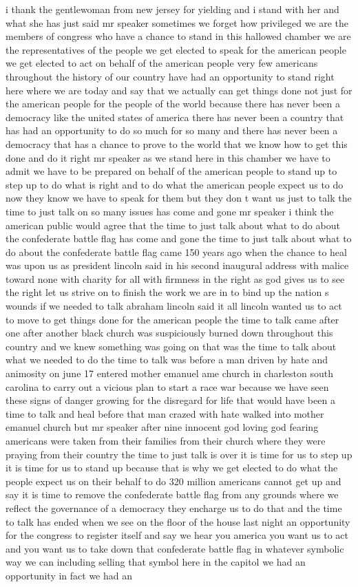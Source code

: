 \documentclass{article}
\begin{document}
i thank the gentlewoman from new jersey for yielding and i stand with her and what she has just said mr speaker sometimes we forget how privileged we are the members of congress who have a chance to stand in this hallowed chamber we are the representatives of the people we get elected to speak for the american people we get elected to act on behalf of the american people very few americans throughout the history of our country have had an opportunity to stand right here where we are today and say that we actually can get things done not just for the american people for the people of the world because there has never been a democracy like the united states of america there has never been a country that has had an opportunity to do so much for so many and there has never been a democracy that has a chance to prove to the world that we know how to get this done and do it right mr speaker as we stand here in this chamber we have to admit we have to be prepared on behalf of the american people to stand up to step up to do what is right and to do what the american people expect us to do now they know we have to speak for them but they don t want us just to talk the time to just talk on so many issues has come and gone mr speaker i think the american public would agree that the time to just talk about what to do about the confederate battle flag has come and gone the time to just talk about what to do about the confederate battle flag came 150 years ago when the chance to heal was upon us as president lincoln said in his second inaugural address with malice toward none with charity for all with firmness in the right as god gives us to see the right let us strive on to finish the work we are in to bind up the nation s wounds if we needed to talk abraham lincoln said it all lincoln wanted us to act to move to get things done for the american people the time to talk came after one after another black church was suspiciously burned down throughout this country and we knew something was going on that was the time to talk about what we needed to do the time to talk was before a man driven by hate and animosity on june 17 entered mother emanuel ame church in charleston south carolina to carry out a vicious plan to start a race war because we have seen these signs of danger growing for the disregard for life that would have been a time to talk and heal before that man crazed with hate walked into mother emanuel church but mr speaker after nine innocent god loving god fearing americans were taken from their families from their church where they were praying from their country the time to just talk is over it is time for us to step up it is time for us to stand up because that is why we get elected to do what the people expect us on their behalf to do 320 million americans cannot get up and say it is time to remove the confederate battle flag from any grounds where we reflect the governance of a democracy they encharge us to do that and the time to talk has ended when we see on the floor of the house last night an opportunity for the congress to register itself and say we hear you america you want us to act and you want us to take down that confederate battle flag in whatever symbolic way we can including selling that symbol here in the capitol we had an opportunity in fact we had an 
\end{document}
